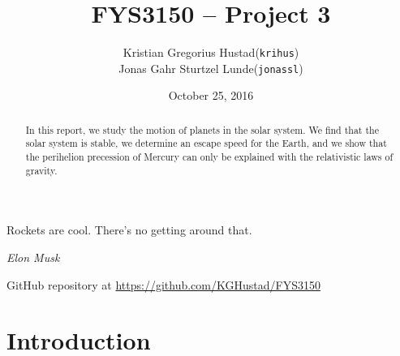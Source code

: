 \documentclass[a4paper]{article}
\begin{document}
\title{FYS3150 -- Project 3}
\author{
    \begin{tabular}{r l}
        Kristian Gregorius Hustad & (\texttt{krihus})\\
        Jonas Gahr Sturtzel Lunde & (\texttt{jonassl})
    \end{tabular}}
\date{October 25, 2016}    %

\maketitle




\setlength{\epigraphwidth}{0.75\textwidth}
\renewcommand{\epigraphflush}{center}
\renewcommand{\beforeepigraphskip}{50pt}
\renewcommand{\afterepigraphskip}{100pt}
\renewcommand{\epigraphsize}{\normalsize}

\epigraph{Rockets are cool. There's no getting around that.}
{\textit{Elon Musk}}


\begin{abstract}
\noindent
In this report, we study the motion of planets in the solar system. We find that the solar system is stable, we determine an escape speed for the Earth, and we show that the perihelion precession of Mercury can only be explained with the relativistic laws of gravity.
\end{abstract}

\vfill


\begin{center}
    GitHub repository at \url{https://github.com/KGHustad/FYS3150}
\end{center}

\newpage

\newcommand{\half}{\frac{1}{2}}
\newcommand{\dt}{{\Delta t}}
\newcommand{\dx}{{\Delta x}}
\newcommand{\bigO}{{\mathcal{O}}}

\newcommand{\supnew}{^{\mathrm{new}}}



\section{Introduction}\label{sec:intro}
\end{document}
